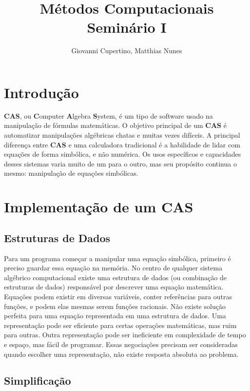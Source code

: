 \documentclass[a4]{article}
\title{Métodos Computacionais\\ Seminário I}
\author{Giovanni Cupertino, Matthias Nunes}
\begin{document}
\maketitle

\section{Introdução}

	\textbf{CAS}, ou \textbf{C}omputer \textbf{A}lgebra \textbf{S}ystem, é um
	tipo de software usado na manipulação de fórmulas matemáticas. O objetivo
	principal de um \textbf{CAS} é automatizar manipulações algébricas chatas e
	muitas vezes difíceis. A principal diferença entre \textbf{CAS} e uma
	calculadora tradicional é a habilidade de lidar com equações de forma
	simbólica, e não numérica. Os usos específicos e capacidades desses sistemas
	varia muito de um para o outro, mas seu propósito continua o mesmo:
	manipulação de equações simbólicas.

\section{Implementação de um CAS}

	\subsection{Estruturas de Dados}

		Para um programa começar a manipular uma equação simbólica, primeiro é
		preciso guardar essa equação na memória. No centro de qualquer sistema
		algébrico computacional existe uma estrutura de dados (ou combinação de
		estruturas de dados) responsável por descrever uma equação matemática.
		Equações podem existir em diversas variáveis, conter referências para
		outras funções, e podem elas mesmas serem funções racionais. Não existe
		solução perfeita para uma equação representada em uma estrutura de
		dados. Uma representação pode ser eficiente para certas operações
		matemáticas, mas ruim para outras. Outra representação pode ser
		ineficiente em complexidade de tempo e espaço, mas fácil de programar.
		Essas negociações precisam ser consideradas quando escolher uma
		representação, não existe resposta absoluta ao problema.

	\subsection{Simplificação}
\end{document}
